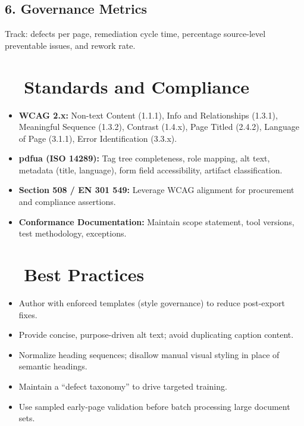 \subsection*{6. Governance Metrics}
Track: defects per page, remediation cycle time, percentage source-level preventable issues, and rework rate.

\section{~~Standards and Compliance}\label{ch18:sec:standards-compliance}
\begin{itemize}
	\item \textbf{WCAG 2.x:} Non-text Content (1.1.1), Info and Relationships (1.3.1), Meaningful Sequence (1.3.2), Contrast (1.4.x), Page Titled (2.4.2), Language of Page (3.1.1), Error Identification (3.3.x).
	\item \textbf{\gls{pdfua} (ISO 14289):} Tag tree completeness, role mapping, alt text, metadata (title, language), form field accessibility, artifact classification\supercite{AdobePDFUA}.
	\item \textbf{Section 508 / EN 301 549:} Leverage WCAG alignment for procurement and compliance assertions.
	\item \textbf{Conformance Documentation:} Maintain scope statement, tool versions, test methodology, exceptions.
\end{itemize}

\section{~~Best Practices}\label{ch18:sec:best-practices}
\begin{itemize}
	\item Author with enforced templates (style governance) to reduce post-export fixes.
	\item Provide concise, purpose-driven alt text; avoid duplicating caption content.
	\item Normalize heading sequences; disallow manual visual styling in place of semantic headings.
	\item Maintain a “defect taxonomy” to drive targeted training.
	\item Use sampled early-page validation before batch processing large document sets.
\end{itemize}

